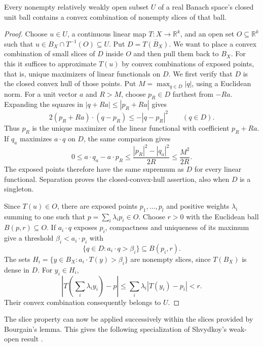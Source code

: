 \begin{lemma}\label{lem:slice-combination}
Every nonempty relatively weakly open subset $U$ of a real Banach
space's closed unit ball contains a convex combination of nonempty
slices of that ball.
\end{lemma}
\begin{proof}
Choose $u\in U$, a continuous linear map $T:X\to\mathbb R^k$, and an
open set $O\subseteq\mathbb R^k$ such that
$u\in B_X\cap T^{-1}(O)\subseteq U$.  Put $D=\overline{T(B_X)}$.  We want to place a convex combination of
small slices of $D$ inside $O$ and then pull them back to $B_X$.
For this it suffices to approximate $T(u)$ by convex combinations of
exposed points, that is, unique maximizers of linear functionals on
$D$.  We first verify that $D$ is the closed convex hull of those points.
Put $M=\max_{q\in D}|q|$, using a Euclidean norm.  For a unit vector $a$
and $R>M$, choose $p_R\in D$ farthest from $-Ra$.  Expanding the squares
in $|q+Ra|\le|p_R+Ra|$ gives
\[
 2(p_R+Ra)\cdot(q-p_R)\le-|q-p_R|^2\qquad(q\in D).
\]
Thus $p_R$ is the unique maximizer of the linear functional with
coefficient $p_R+Ra$.  If $q_a$ maximizes $a\cdot q$ on $D$, the same
comparison gives
\[
 0\le a\cdot q_a-a\cdot p_R
 \le\frac{|p_R|^2-|q_a|^2}{2R}\le\frac{M^2}{2R}.
\]
The exposed points therefore have the same supremum as $D$ for every
linear functional.  Separation proves the closed-convex-hull assertion,
also when $D$ is a singleton.

Since $T(u)\in O$, there are exposed points $p_1,\ldots,p_l$ and
positive weights $\lambda_i$ summing to one such that
$p=\sum_i\lambda_i p_i\in O$.  Choose $r>0$ with the Euclidean ball
$B(p,r)\subseteq O$.  If $a_i\cdot q$ exposes $p_i$, compactness and
uniqueness of its maximum give a threshold $\beta_i<a_i\cdot p_i$ with
\[
 \{q\in D:a_i\cdot q>\beta_i\}\subseteq B(p_i,r).
\]
The sets $H_i=\{y\in B_X:a_i\cdot T(y)>\beta_i\}$ are nonempty slices,
since $T(B_X)$ is dense in $D$.  For $y_i\in H_i$,
\[
 \left|T\left(\sum_i\lambda_i y_i\right)-p\right|
 \le\sum_i\lambda_i|T(y_i)-p_i|<r.
\]
Their convex combination consequently belongs to $U$.
\end{proof}

The slice property can now be applied successively within the slices
provided by Bourgain's lemma.  This gives the following specialization
of Shvydkoy's weak-open result \cite[Lemma~3]{Shvydkoy2000}.

